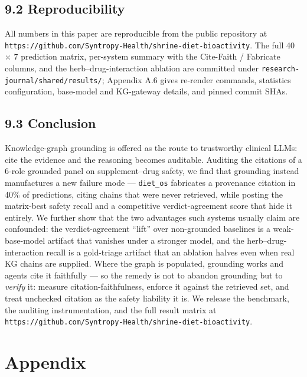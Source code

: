 \documentclass[
]{article}
\begin{document}
\hypertarget{reproducibility}{%
\subsection{9.2 Reproducibility}\label{reproducibility}}

All numbers in this paper are reproducible from the public repository at
\texttt{https://github.com/Syntropy-Health/shrine-diet-bioactivity}. The
full 40 × 7 prediction matrix, per-system summary with the Cite-Faith /
Fabricate columns, and the herb--drug-interaction ablation are committed
under \texttt{research-journal/shared/results/}; Appendix A.6 gives
re-render commands, statistics configuration, base-model and KG-gateway
details, and pinned commit SHAs.

\hypertarget{conclusion}{%
\subsection{9.3 Conclusion}\label{conclusion}}

Knowledge-graph grounding is offered as the route to trustworthy
clinical LLMs: cite the evidence and the reasoning becomes auditable.
Auditing the citations of a 6-role grounded panel on supplement--drug
safety, we find that grounding instead manufactures a new failure mode
--- \texttt{diet\_os} fabricates a provenance citation in 40\% of
predictions, citing chains that were never retrieved, while posting the
matrix-best safety recall and a competitive verdict-agreement score that
hide it entirely. We further show that the two advantages such systems
usually claim are confounded: the verdict-agreement ``lift'' over
non-grounded baselines is a weak-base-model artifact that vanishes under
a stronger model, and the herb--drug-interaction recall is a gold-triage
artifact that an ablation halves even when real KG chains are supplied.
Where the graph is populated, grounding works and agents cite it
faithfully --- so the remedy is not to abandon grounding but to
\emph{verify} it: measure citation-faithfulness, enforce it against the
retrieved set, and treat unchecked citation as the safety liability it
is. We release the benchmark, the auditing instrumentation, and the full
result matrix at
\texttt{https://github.com/Syntropy-Health/shrine-diet-bioactivity}.



\appendix

\hypertarget{appendix}{%
\section{Appendix}\label{appendix}}
\end{document}
